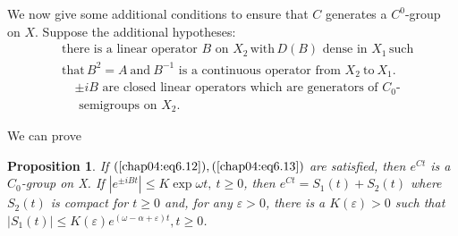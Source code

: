 \documentclass{surv-l}
\theoremstyle{plain}
\newtheorem{proposition}[theorem]{Proposition}
\theoremstyle{definition}
\numberwithin{equation}{section}
\numberwithin{figure}{chapter}
\begin{document}
We now give some additional conditions to ensure that $C$ generates a $C^{0}$-group on $X$. Suppose the additional hypotheses:
\begin{equation}\label{chap04:eq6.12}
\begin{split}
&\text{there is a linear operator } B  \text{ on } X_{2}\, \mathrm{with}\, D(B) \text{ dense in }X_{1}\,\mathrm{such}\\
&\mathrm{that}\, B^{2}=A\ \mathrm{and}\ B^{-1} \text{ is a continuous operator from } X_{2}\ \mathrm{to}\ X_{1}.
\end{split}
\end{equation}
\begin{equation}
\begin{split}\label{chap04:eq6.13}
&\pm iB \text{ are closed linear operators which are generators of }C_{0}\text{-}\\
&\text{ semigroups  on } X_{2}.
\end{split}
\end{equation}

We can prove

\begin{proposition}\label{prop4.6.6} If $(\ref{chap04:eq6.12}), (\ref{chap04:eq6.13})$ are satisfied, then $e^{Ct}$ is a $C_{0}$-group
on X. If $|e^{\pm iBt}|\leq K\exp\omega t,\ t\geq 0$, then $e^{Ct}=S_{1}(t)+S_{2}(t)$ where $S_{2}(t)$ is compact for $t\geq 0$ and, for any $\varepsilon >0$, there is a $K(\varepsilon)>0$ such that $|S_{1}(t)|\leq K(\varepsilon)e^{(\omega-\alpha+\varepsilon)t}, t\geq 0$.
\end{proposition}
\end{document}
